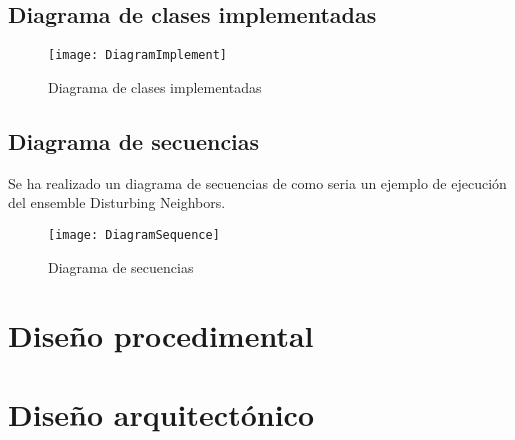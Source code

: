 \subsection{Diagrama de clases implementadas}\label{diagram-implement}
\begin{figure}
\centering
\texttt{[image: DiagramImplement]}
\caption{Diagrama de clases implementadas}
\label{fig:DiagramImplement}
\end{figure}

\subsection{Diagrama de secuencias}\label{diagrama-secuencias}
Se ha realizado un diagrama de secuencias de como seria un ejemplo de ejecución del ensemble Disturbing Neighbors.
\begin{figure}
\centering
\texttt{[image: DiagramSequence]}
\caption{Diagrama de secuencias}
\label{fig:DiagramSequence}
\end{figure}

\section{Diseño procedimental}

\section{Diseño arquitectónico}


